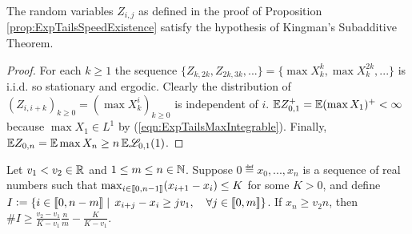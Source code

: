 \begin{lemma}\label{lem:ExpTailsKingmanHolds}
The random variables $Z_{i,j}$ as defined in the proof of Proposition \ref{prop:ExpTailsSpeedExistence} satisfy the hypothesis of Kingman's Subadditive Theorem. 
\end{lemma}

\begin{proof}
For each $k \geq 1$ the sequence $\{Z_{k, 2k}, Z_{2k, 3k}, ...\} = \{\max X^k_k, \max X^{2k}_k, ... \}$ is i.i.d. so stationary and ergodic. Clearly the distribution of $(Z_{i, i + k})_{k \geq 0} = (\max X^i_k)_{k \geq 0}$ is independent of $i$. $\mathbb{E} Z^+_{0,1} = \mathbb{E} (\max X_1)^+ < \infty$ because $\max X_1 \in L^1$ by (\ref{eqn:ExpTailsMaxIntegrable}). Finally, $\mathbb{E} Z_{0, n} = \mathbb{E} \max X_n \geq n\, \mathbb{E} \mathscr{L}_{0,1}(1)$. 
\end{proof}

\begin{lemma}\label{lem:ExpTailsGoodSequencesTechnical}
Let $v_1 < v_2 \in \mathbb{R}$ and $1 \leq m \leq n \in \mathbb{N}$. Suppose $0 \eqdef x_0, ..., x_n$ is a sequence of real numbers such that $\max_{i \in \llbracket0, n - 1\rrbracket} (x_{i+1} - x_i) \leq K$ for some $K > 0$, and define $I \vcentcolon= \{ i \in \llbracket0, n - m\rrbracket \mid\, x_{i + j} - x_i \geq j v_1,\quad \forall j\in\llbracket0,m\rrbracket\}$. If $x_n \geq v_2 n$, then $\#I \geq \frac{v_2 - v_1}{K - v_1}\frac{n}{m} - \frac{K}{K - v_1}$. 
\end{lemma}






